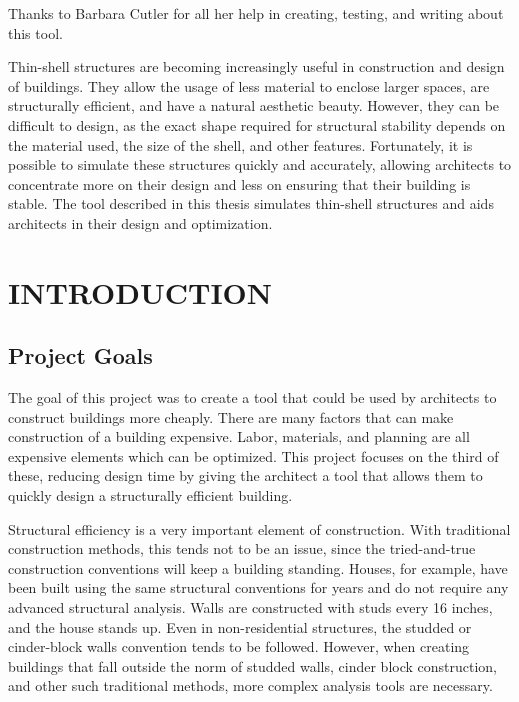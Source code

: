\documentclass{thesis}
\author{R. Allan Pendergrast}
\begin{document}
 
\titlepage             %
\tableofcontents       %
\listoftables          %
\listoffigures         %

Thanks to Barbara Cutler for all her help in creating, testing, and writing about this tool.

Thin-shell structures are becoming increasingly useful in construction and design of buildings.  They allow the usage of less material to enclose
larger spaces, are structurally efficient, and have a natural aesthetic beauty.  However, they can be difficult to design, as the exact shape
required for structural stability depends on the material used, the size of the shell, and other features.  Fortunately, it is possible to simulate
these structures quickly and accurately, allowing architects to concentrate more on their design and less on ensuring that their building is
stable.  The tool described in this thesis simulates thin-shell structures and aids architects in their design and optimization.

\chapter{INTRODUCTION}

\section{Project Goals}
The goal of this project was to create a tool that could be used by architects to construct buildings more cheaply.  There are many factors
that can make construction of a building expensive.  Labor, materials, and planning are all expensive elements which can be optimized.
This project focuses on the third of these, reducing design time by giving the architect a tool that allows them to quickly design a
structurally efficient building.

Structural efficiency is a very important element of construction.  With traditional construction methods, this tends not to be an issue, since
the tried-and-true construction conventions will keep a building standing.  Houses, for example, have been built using the same structural
conventions for years and do not require any advanced structural analysis.  Walls are constructed with studs every 16 inches, and the house
stands up.  Even in non-residential structures, the studded or cinder-block walls convention tends to be followed.  However, when creating
buildings that fall outside the norm of studded walls, cinder block construction, and other such traditional methods, more complex analysis
tools are necessary.  
\end{document}
